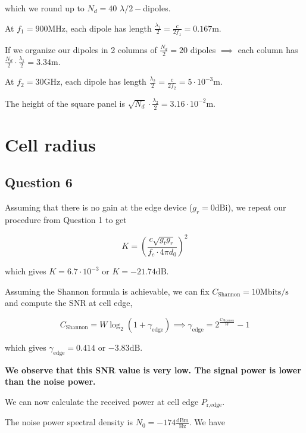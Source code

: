 \documentclass[]{article}
\begin{document}
	which we round up to $N_d = 40$ $ \lambda/2 - $dipoles.
	
	At $f_1=900\mathrm{MHz}$, each dipole has length $\frac{\lambda_1}{2} = \frac{c}{2f_1} = 0.167\mathrm{m}$.
	
	If we organize our dipoles in 2 columns of $\frac{N_d}{2} = 20$ dipoles $\implies$ each column has $\frac{N_d}{2} \cdot \frac{\lambda_1}{2} = 3.34\mathrm{m}$.
	
	At $f_2=30\mathrm{GHz}$, each dipole has length $\frac{\lambda_2}{2} = \frac{c}{2f_2} = 5 \cdot 10^{-3}\mathrm{m}$.
	
	The height of the square panel is $\sqrt{N_d} \cdot \frac{\lambda_2}{2} = 3.16 \cdot 10^{-2} \mathrm{m}$.
	
	\section{Cell radius}
	
	\subsection*{Question 6}
	
	Assuming that there is no gain at the edge device ($g_r = 0\mathrm{dBi}$), we repeat our procedure from Question 1 to get
	
	\begin{equation}
		K = \left(\frac{c \sqrt{g_t g_r}}{f_c \cdot 4 \pi d_0}\right)^2
	\end{equation}
	
	which gives $K = 6.7 \cdot 10^{-3}$ or $K = -21.74\mathrm{dB}$.
	
	Assuming the Shannon formula is achievable, we can fix $C_{\text{Shannon}} = 10\mathrm{Mbits/s}$ and compute the SNR at cell edge,
	
	\begin{equation}
		C_{\text{Shannon}} = W \log_{2}(1 + \gamma_{\text{edge}}) \implies \gamma_{\text{edge}} = 2^{\frac{C_{\text{Shannon}}}{W}} - 1
	\end{equation}
	
	which gives $\gamma_{\text{edge}} = 0.414$ or $-3.83\mathrm{dB}$.
	
	\textbf{We observe that this SNR value is very low. The signal power is lower than the noise power.}
	
	We can now calculate the received power at cell edge $P_{\text{r,edge}}$.
	
	The noise power spectral density is $N_0 = -174 \frac{\mathrm{dBm}}{\mathrm{Hz}}$. We have
	
\end{document}
